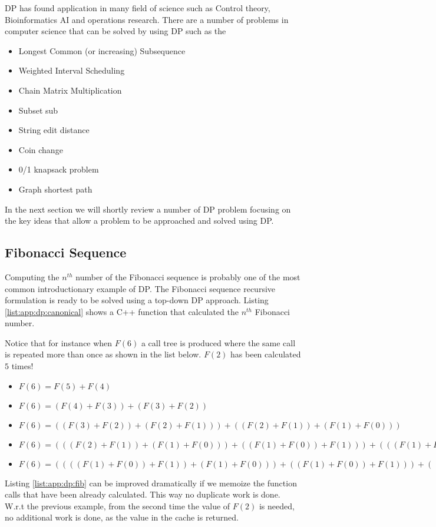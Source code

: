 DP has found application in many field of science such as Control theory,
Bioinformatics AI and operations research. There are a number of problems in
computer science that can be solved by using DP such as the 
\begin{itemize}
    \item Longest Common (or increasing) Subsequence
    \item Weighted Interval Scheduling
    \item Chain Matrix Multiplication
    \item Subset sub
    \item String edit distance
    \item Coin change
    \item 0/1 knapsack problem
    \item Graph shortest path
\end{itemize}

In the next section we will shortly review a number of DP problem focusing on
the key ideas that allow a problem to be approached and solved  using DP.

\subsection*{Fibonacci Sequence}
Computing the $n^{th}$ number of the Fibonacci sequence is probably one of the
most common introductionary example of DP. The Fibonacci sequence recursive
formulation is ready to be solved using a top-down DP approach. Listing
\ref{list:app:dp:canonical} shows a C++ function that calculated the $n^{th}$ Fibonacci
number.

Notice that for instance when $F(6)$ a call tree is produced where the same call
is repeated more than once as shown in the list below. $F(2)$ has been
calculated $5$ times!
\begin{itemize}
    \item $F(6) = F(5)+F(4)$
    \item $F(6) = (F(4)+F(3)) + (F(3)+F(2))$
    \item $F(6) = ((F(3)+F(2))+(F(2)+F(1))) + ((F(2)+F(1))+(F(1)+F(0)))$
    \item $F(6) = (((F(2)+F(1))+(F(1)+F(0)))+((F(1)+F(0))+F(1))) + (((F(1)+F(0))+F(1))+(F(1)+F(0)))$
    \item $F(6) = ((((F(1)+F(0))+F(1))+(F(1)+F(0)))+((F(1)+F(0))+F(1))) + (((F(1)+F(0))+F(1))+(F(1)+F(0)))$
\end{itemize}

Listing \ref{list:app:dp:fib} can be improved dramatically if we memoize the function calls
that have been already calculated. This way no duplicate work is done. W.r.t the
previous example, from the second time the value of $F(2)$ is needed, no
additional work is done, as the value in the cache is returned.

